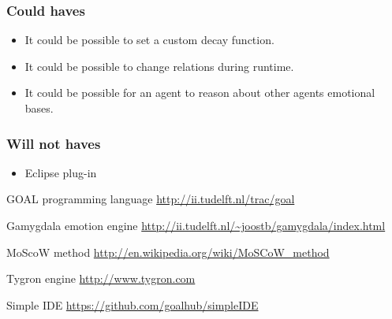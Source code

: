 \documentclass[]{article}
\begin{document}
\subsubsection*{Could haves}

\begin{itemize}
	\item It could be possible to set a custom decay function.
	\item It could be possible to change relations during runtime.
	
	\item It could be possible for an agent to reason about other agents emotional bases.
\end{itemize}

\subsubsection*{Will not haves}
\begin{itemize}
	\item Eclipse plug-in
\end{itemize}

\clearpage
\printglossaries


\begin{thebibliography}{9}
	
	GOAL programming language
	\url{http://ii.tudelft.nl/trac/goal}
	
	Gamygdala emotion engine
	\url{http://ii.tudelft.nl/~joostb/gamygdala/index.html}
	
	MoScoW method
	\url{http://en.wikipedia.org/wiki/MoSCoW_method }
	
	Tygron engine
	\url{http://www.tygron.com }
	
	Simple IDE
	\url{https://github.com/goalhub/simpleIDE }
	
	
\end{thebibliography}
\end{document}
